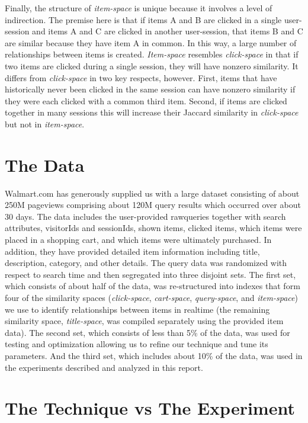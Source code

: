 \documentclass{article}
\begin{document}
Finally, the structure of {\em item-space} is unique because it involves a level
of indirection. The premise here is that if items A and B are clicked in a
single user-session and items A and C are clicked in another user-session, that
items B and C are similar because they have item A in common. In this way, a
large number of relationships between items is created. {\em Item-space}
resembles {\em click-space} in that if two items are clicked during a single
session, they will have nonzero similarity. It differs from {\em click-space} in
two key respects, however. First, items that have historically never been
clicked in the same session can have nonzero similarity if they were each
clicked with a common third item. Second, if items are clicked together in many
sessions this will increase their Jaccard similarity in {\em click-space} but
not in {\em item-space}.

\section{The Data}

Walmart.com has generously supplied us with a large dataset consisting of about
250M pageviews comprising about 120M query results which occurred over about 30
days. The data includes the user-provided rawqueries together with search
attributes, visitorIds and sessionIds, shown items, clicked items, which items
were placed in a shopping cart, and which items were ultimately purchased. In
addition, they have provided detailed item information including title,
description, category, and other details. The query data was randomized with
respect to search time and then segregated into three disjoint sets. The first
set, which consists of about half of the data, was re-structured into indexes
that form four of the similarity spaces ({\em click-space}, {\em cart-space}, 
{\em query-space}, and {\em item-space}) we use to identify relationships between 
items in realtime (the remaining similarity space, {\em title-space}, was compiled
separately using the provided item data). The second set, which consists of less 
than 5\% of the data, was used for testing and optimization allowing us to refine 
our technique and tune its parameters. And the third set, which includes about 
10\% of the data, was used in the experiments described and analyzed in this 
report.

\section{The Technique vs The Experiment}
\end{document}
